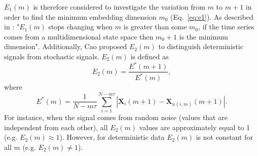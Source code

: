 \documentclass[fleqn,10pt]{wlscirep}
\begin{document}
$E_1(m)$ is therefore considered to investigate the variation from $m$ to $m+1$
in order to find the minimum embedding dimension $m_0$ (Eq.~\ref{eq:e1}).
As described in \cite{Cao1997}: "$E_1(m)$ stops changing when $m$ is greater
than some $m_0$, if the time series comes from a multidimensional state space
then $m_0 + 1$ is the minimum dimension".
Additionally, Cao proposed $E_2(m)$ to distinguish deterministic signals from
stochastic signals. $E_2(m)$ is defined as
\begin{equation}\label{eq:e2}
E_2(m) = \frac{ E^* (m+1) } { E^*(m)},
\end{equation}
where
\begin{equation}\label{eq:ee}
E^*(m) = \frac{1}{N-m\tau} \sum_{i=1}^{N-m\tau}
|  \boldsymbol{X}_i(m+1) - \boldsymbol{X}_{n(i,m)}(m+1) |.
\end{equation}
For instance, when the signal comes from random noise (values that are 
independent from each other), all $E_2(m)$ values are approximately equal 
to 1 (e.g. $E_2(m) \approx 1$). However, for deterministic data $E_2(m)$ is 
not constant for all $m$ (e.g. $E_2(m) \neq 1$).
\end{document}
